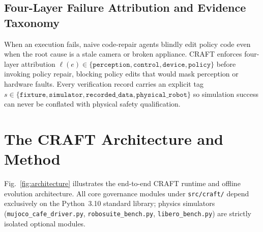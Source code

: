 \documentclass[10pt,journal]{IEEEtran}
\begin{document}
\subsection{Four-Layer Failure Attribution and Evidence Taxonomy}
When an execution fails, naive code-repair agents blindly edit policy code even when the root cause is a stale camera or broken appliance. CRAFT enforces four-layer attribution $\ell(e) \in \{\texttt{perception},\allowbreak \texttt{control},\allowbreak \texttt{device},\allowbreak \texttt{policy}\}$ before invoking policy repair, blocking policy edits that would mask perception or hardware faults. Every verification record carries an explicit tag $s \in \{\texttt{fixture},\allowbreak \texttt{simulator},\allowbreak \texttt{recorded\_data},\allowbreak \texttt{physical\_robot}\}$ so simulation success can never be conflated with physical safety qualification.

\section{The CRAFT Architecture and Method}
\label{sec:method}

Fig.~\ref{fig:architecture} illustrates the end-to-end CRAFT runtime and offline evolution architecture. All core governance modules under \texttt{src/craft/} depend exclusively on the Python~3.10 standard library; physics simulators (\texttt{mujoco\_cafe\_driver.py}, \texttt{robosuite\_bench.py}, \texttt{libero\_bench.py}) are strictly isolated optional modules.
\end{document}
